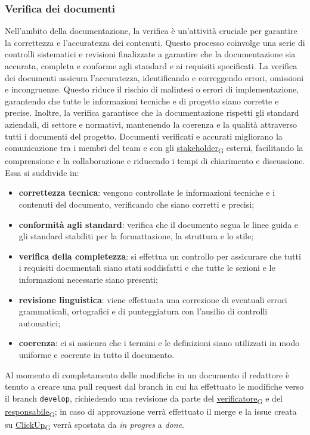 \subsubsection{Verifica dei documenti} \label{verifica_dei_documenti}
Nell'ambito della documentazione, la verifica è un'attività cruciale per garantire la correttezza e l'accuratezza dei contenuti. Questo processo coinvolge una serie di controlli sistematici e revisioni finalizzate a garantire che la documentazione sia accurata, completa e conforme agli standard e ai requisiti specificati.
La verifica dei documenti assicura l'accuratezza, identificando e correggendo errori, omissioni e incongruenze. Questo riduce il rischio di malintesi o errori di implementazione, garantendo che tutte le informazioni tecniche e di progetto siano corrette e precise.
Inoltre, la verifica garantisce che la documentazione rispetti gli standard aziendali, di settore e normativi, mantenendo la coerenza e la qualità attraverso tutti i documenti del progetto. Documenti verificati e accurati migliorano la comunicazione tra i membri del team e con gli \href{https://7last.github.io/docs/rtb/documentazione-interna/glossario\#stakeholder}{stakeholder\textsubscript{G}} esterni, facilitando la comprensione e la collaborazione e riducendo i tempi di chiarimento e discussione. Essa si suddivide in:
\begin{itemize}
	\item \textbf{correttezza tecnica}: vengono controllate le informazioni tecniche e i contenuti del documento, verificando che siano corretti e precisi;
	\item \textbf{conformità agli standard}: verifica che il documento segua le linee guida e gli standard stabiliti per la formattazione, la struttura e lo stile;
	\item \textbf{verifica della completezza}: si effettua un controllo per assicurare che tutti i requisiti documentali siano stati soddisfatti e che  tutte le sezioni e le informazioni necessarie siano presenti;
	\item \textbf{revisione linguistica}: viene effettuata una correzione di eventuali errori grammaticali, ortografici e di punteggiatura con l'ausilio di controlli automatici;
	\item \textbf{coerenza}: ci si assicura che i termini e le definizioni siano utilizzati in modo uniforme e coerente in tutto il documento.
\end{itemize}

Al momento di completamento delle modifiche in un documento il redattore è tenuto a creare una pull request dal branch in cui ha effettuato le modifiche verso il branch \texttt{develop}, richiedendo una revisione da parte del \href{https://7last.github.io/docs/rtb/documentazione-interna/glossario\#verificatore}{verificatore\textsubscript{G}} e del \href{https://7last.github.io/docs/rtb/documentazione-interna/glossario\#responsabile}{responsabile\textsubscript{G}}; in caso di approvazione verrà effettuato il merge e la issue creata su \href{https://7last.github.io/docs/rtb/documentazione-interna/glossario\#clickup}{ClickUp\textsubscript{G}} verrà spostata da \textit{in progres} a \textit{done}.

